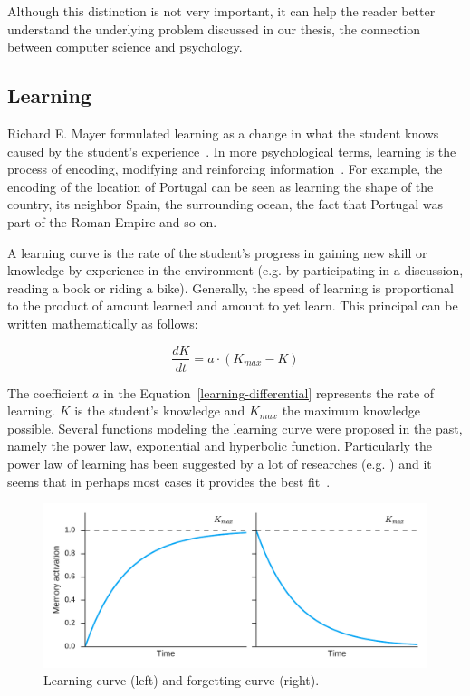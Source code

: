 Although this distinction is not very important, it can help the reader better understand the underlying problem discussed in our thesis, the connection between computer science and psychology.

\subsection{Learning}
\label{learning}

Richard E. Mayer formulated learning as a change in what the student knows caused by the student's experience~\cite{RichardE.Mayer2010}. In more psychological terms, learning is the process of encoding, modifying and reinforcing information~\cite{Lewis}. For example, the encoding of the location of Portugal can be seen as learning the shape of the country, its neighbor Spain, the surrounding ocean, the fact that Portugal was part of the Roman Empire and so on.

A learning curve is the rate of the student's progress in gaining new skill or knowledge by experience in the environment (e.g. by participating in a discussion, reading a book or riding a bike). Generally, the speed of learning is proportional to the product of amount learned and amount to yet learn. This principal can be written mathematically as follows:

\begin{equation} \label{learning-differential}
  \frac{dK}{dt} = a \cdot (K_{max} - K)
\end{equation}

The coefficient $a$ in the Equation~\ref{learning-differential} represents the rate of learning. $K$ is the student's knowledge and $K_{max}$ the maximum knowledge possible. Several functions modeling the learning curve were proposed in the past, namely the power law, exponential and hyperbolic function. Particularly the power law of learning has been suggested by a lot of researches (e.g. \cite{newell1981mechanisms}) and it seems that in perhaps most cases it provides the best fit~\cite{martin2011evaluating, koedinger2004distinguishing}.

\begin{figure}[htbp]
  \centering
  \includegraphics[width=\textwidth]{img/learning-forgetting-curves}
  \caption{Learning curve (left) and forgetting curve (right).}
  \label{fig:learning-forgetting-curves}
\end{figure}

